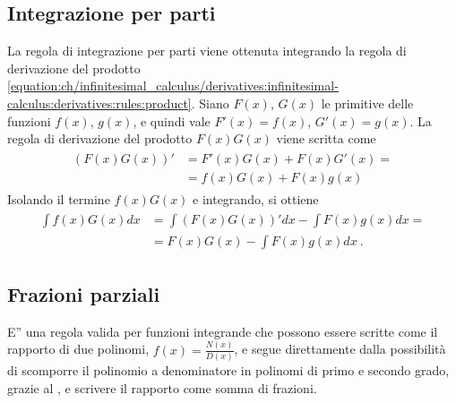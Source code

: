 \documentclass[letterpaper,10pt,italian]{jupyterBook}
\begin{document}
\subsection{Integrazione per parti}
\label{\detokenize{ch/infinitesimal_calculus/integrals:integrazione-per-parti}}\label{\detokenize{ch/infinitesimal_calculus/integrals:infinitesimal-calculus-integrals-by-parts}}
\sphinxAtStartPar
La regola di integrazione per parti viene ottenuta integrando la regola di derivazione del prodotto \eqref{equation:ch/infinitesimal_calculus/derivatives:infinitesimal-calculus:derivatives:rules:product}. Siano \(F(x)\), \(G(x)\) le primitive delle funzioni \(f(x)\), \(g(x)\), e quindi vale \(F'(x) = f(x)\), \(G'(x) = g(x)\).
La regola di derivazione del prodotto \(F(x)G(x)\) viene scritta come
\begin{equation*}
\begin{split}\begin{aligned}
  (F(x) G(x))' & = F'(x) G(x) + F(x) G'(x) = \\
  & = f(x) G(x) + F(x) g(x)
\end{aligned}\end{split}
\end{equation*}
\sphinxAtStartPar
Isolando il termine \(f(x)G(x)\) e integrando, si ottiene
\begin{equation*}
\begin{split}\begin{aligned}
\int f(x) G(x) dx & = \int (F(x) G(x))' dx - \int F(x) g(x) dx = \\
& = F(x) G(x) - \int F(x) g(x) dx  \ .
\end{aligned}\end{split}
\end{equation*}

\subsection{Frazioni parziali}
\label{\detokenize{ch/infinitesimal_calculus/integrals:frazioni-parziali}}
\sphinxAtStartPar
{} E” una regola valida per funzioni integrande che possono essere scritte come il rapporto di due polinomi, \(f(x) = \frac{N(x)}{D(x)}\), e segue direttamente dalla possibilità di scomporre il polinomio a denominatore in polinomi di primo e secondo grado, grazie al {\hyperref[\detokenize{ch/precalculus/polynomials:math-hs-precalculus-polynomials-alg-fund-thm}]{}}, e scrivere il rapporto come somma di frazioni.
\end{document}
